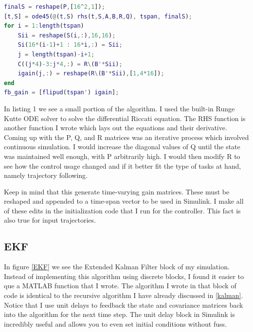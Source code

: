 \documentclass[conf]{new-aiaa}
\begin{document}
\begin{doublespace}
\begin{singlespace}
\begin{lstlisting}[language=Matlab, caption = LQR Solve]
finalS = reshape(P,[16^2,1]);
[t,S] = ode45(@(t,S) rhs(t,S,A,B,R,Q), tspan, finalS);
for i = 1:length(tspan)
	Sii = reshape(S(i,:),16,16);
	Si(16*(i-1)+1 : 16*i,:) = Sii;
	j = length(tspan)-i+1;
	C((j*4)-3:j*4,:) = R\(B'*Sii);
	igain(j,:) = reshape(R\(B'*Sii),[1,4*16]);
end 
fb_gain = [flipud(tspan') igain];
\end{lstlisting}
\end{singlespace}

In listing 1 we see a small portion of the algorithm. I used the built-in Runge Kutte ODE solver to solve the differential Riccati equation. The RHS function is another function I wrote which lays out the equations and their derivative. Coming up with the P, Q, and R matrices was an iterative process which involved continuous simulation. I would increase the diagonal values of Q until the state was maintained well enough, with P arbitrarily high. I would then modify R to see how the control usage changed and if it better fit the type of tasks at hand, namely trajectory following. 

Keep in mind that this generate time-varying gain matrices. These must be reshaped and appended to a time-span vector to be used in Simulink. I make all of these edits in the initialization code that I run for the controller. This fact is also true for input trajectories.

\subsection{EKF}
In figure \ref{EKF} we see the Extended Kalman Filter block of my simulation. Instead of implementing this algorithm using discrete blocks, I found it easier to que a MATLAB function that I wrote. The algorithm I wrote in that block of code is identical to the recursive algorithm I have already discussed in \ref{kalman}. Notice that I use unit delays to feedback the state and covariance matrices back into the algorithm for the next time step. The unit delay block in Simulink is incredibly useful and allows you to even set initial conditions without fuss.


\end{doublespace}
\end{document}
